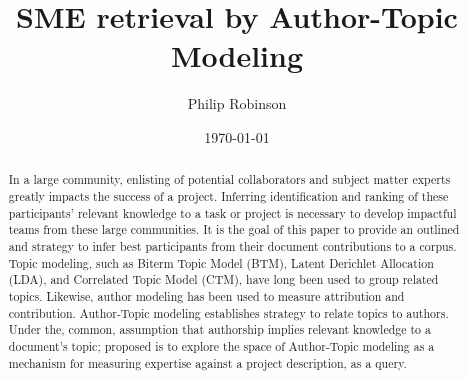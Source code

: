 \documentclass{article}
\title{SME retrieval by Author-Topic Modeling}
\date{\today}
\author{Philip Robinson}
\affil{NASA: Jet Propoultion Labratory}
\begin{document}
\maketitle

\begin{abstract}
  In a large community, enlisting of potential collaborators and subject matter experts
  greatly impacts the success of a project. Inferring identification and ranking of
  these participants' relevant knowledge to a task or project is necessary to develop
  impactful teams from these large communities\cite{Minto2007}. It is the goal of this
  paper to provide an outlined and strategy to infer best participants from their
  document contributions to a corpus. Topic modeling, such as Biterm Topic Model (BTM)\cite{Yan2013,Chen2015}, Latent Derichlet Allocation (LDA),
  and Correlated Topic Model (CTM), have long been used to group related topics\cite{Alghamdi2015}. Likewise,
  author modeling has been used to measure attribution\cite{Rexha2018} and
  contribution\cite{AldebeiHJ016}. Author-Topic modeling establishes strategy to
  relate topics to authors\cite{Rosen-Zvi2004}. Under the, common, assumption that
  authorship implies relevant knowledge to a document's topic; proposed is to explore
  the space of Author-Topic modeling as a mechanism for measuring expertise against a
  project description, as a query.
\end{abstract}

\end{document}
